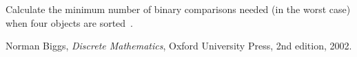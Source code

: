 \begin{questions}
\question
Calculate the minimum number of binary comparisons needed (in the worst case) when four objects are sorted~\cite{biggs02}.
\begin{solution}
\end{solution}

\end{questions}

\begin{thebibliography}{9}

  Norman Biggs,
  \emph{Discrete Mathematics},
  Oxford University Press,
  2nd edition,
  2002.
\end{thebibliography}
